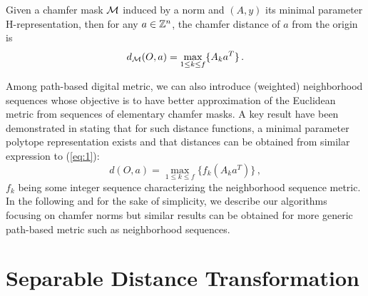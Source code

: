 \documentclass{llncs}
\begin{document}
\begin{proposition}
  Given a chamfer mask $\mathcal{M}$ induced by a  norm and $(A,y)$ its minimal
  parameter H-representation, then for any $a\in{\mathbb{Z}}^n$, the chamfer
  distance of $a$ from the origin is
  \begin{equation}
    \label{eq:1}
    d_{\mathcal{M}}(O,a) =  \max_{1\leq k \leq f} \{ A_k a^T\}\,.
  \end{equation}
\end{proposition}
Among path-based digital metric, we can also introduce (weighted)
neighborhood sequences
\cite{ROSEN_66,mukherjee,Strand2008,DBLP:conf/dgci/NormandSE13}
whose objective is to have better approximation of the Euclidean
metric from sequences of elementary chamfer masks.  A key result have
been demonstrated in \cite{DBLP:conf/dgci/NormandSE13} stating that
for such distance functions, a minimal parameter polytope
representation exists and that distances can be obtained from similar
expression to (\ref{eq:1}):
\begin{equation}
  d(O,a)  =\max_{1\leq k \leq f} \{ f_k(A_k a^T)\}\,,
\end{equation}
$f_k$ being some integer sequence characterizing the neighborhood
sequence metric. In the following and for the sake of simplicity, we
describe our algorithms focusing on chamfer norms but similar results
can be obtained for more generic path-based metric such as
neighborhood sequences.
\section{Separable Distance Transformation}
\label{sec:separ-dist-transf}
\end{document}
